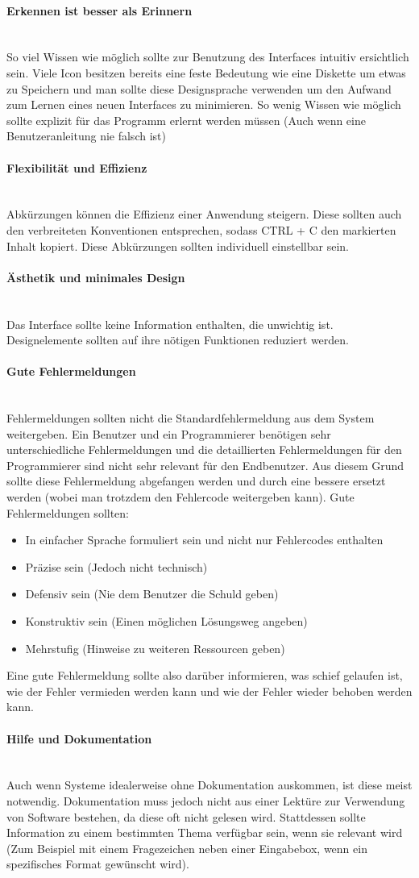 \documentclass{article}
\newcommand{\paragraphlb}[1]{\paragraph{#1}\mbox{}\\}
\begin{document}
	\paragraphlb{Erkennen ist besser als Erinnern}
	So viel Wissen wie möglich sollte zur Benutzung des Interfaces intuitiv ersichtlich sein. Viele Icon besitzen bereits eine feste Bedeutung wie eine Diskette um etwas zu Speichern und man sollte diese Designsprache verwenden um den Aufwand zum Lernen eines neuen Interfaces zu minimieren. So wenig Wissen wie möglich sollte explizit für das Programm erlernt werden müssen (Auch wenn eine Benutzeranleitung nie falsch ist)
	\paragraphlb{Flexibilität und Effizienz}
	Abkürzungen können die Effizienz einer Anwendung steigern. Diese sollten auch den verbreiteten Konventionen entsprechen, sodass CTRL + C den markierten Inhalt kopiert. Diese Abkürzungen sollten individuell einstellbar sein.
	\paragraphlb{Ästhetik und minimales Design}
	Das Interface sollte keine Information enthalten, die unwichtig ist. Designelemente sollten auf ihre nötigen Funktionen reduziert werden.
	\paragraphlb{Gute Fehlermeldungen}
	Fehlermeldungen sollten nicht die Standardfehlermeldung aus dem System weitergeben. Ein Benutzer und ein Programmierer benötigen sehr unterschiedliche Fehlermeldungen und die detaillierten Fehlermeldungen für den Programmierer sind nicht sehr relevant für den Endbenutzer. Aus diesem Grund sollte diese Fehlermeldung abgefangen werden und durch eine bessere ersetzt werden (wobei man trotzdem den Fehlercode weitergeben kann). Gute Fehlermeldungen sollten:
	\begin{itemize}
		\item{In einfacher Sprache formuliert sein und nicht nur Fehlercodes enthalten}
		\item{Präzise sein (Jedoch nicht technisch)}
		\item{Defensiv sein (Nie dem Benutzer die Schuld geben)}
		\item{Konstruktiv sein (Einen möglichen Lösungsweg angeben)}
		\item{Mehrstufig (Hinweise zu weiteren Ressourcen geben)}
	\end{itemize}
	Eine gute Fehlermeldung sollte also darüber informieren, was schief gelaufen ist, wie der Fehler vermieden werden kann und wie der Fehler wieder behoben werden kann.
	\paragraphlb{Hilfe und Dokumentation}
	Auch wenn Systeme idealerweise ohne Dokumentation auskommen, ist diese meist notwendig. Dokumentation muss jedoch nicht aus einer Lektüre zur Verwendung von Software bestehen, da diese oft nicht gelesen wird. Stattdessen sollte Information zu einem bestimmten Thema verfügbar sein, wenn sie relevant wird (Zum Beispiel mit einem Fragezeichen neben einer Eingabebox, wenn ein spezifisches Format gewünscht wird).
\end{document}
